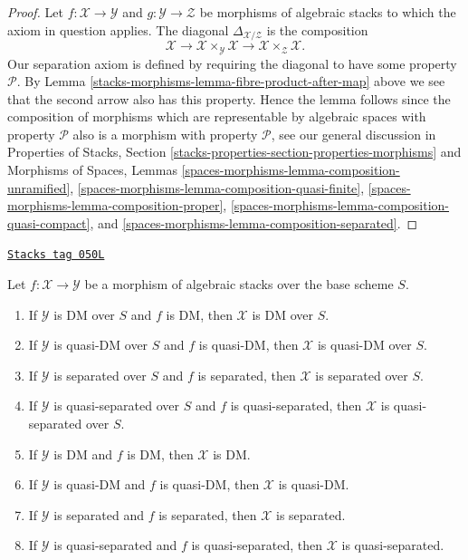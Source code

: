 \begin{proof}
Let $f : \mathcal{X} \to \mathcal{Y}$ and
$g : \mathcal{Y} \to \mathcal{Z}$ be morphisms of algebraic stacks
to which the axiom in question applies.
The diagonal $\Delta_{\mathcal{X}/\mathcal{Z}}$ is the composition
$$
\mathcal{X} \longrightarrow
\mathcal{X} \times_\mathcal{Y} \mathcal{X} \longrightarrow
\mathcal{X} \times_\mathcal{Z} \mathcal{X}.
$$
Our separation axiom is defined by requiring the diagonal
to have some property $\mathcal{P}$. By
Lemma \ref{stacks-morphisms-lemma-fibre-product-after-map}
above we see that the second arrow also has this property.
Hence the lemma follows since the composition of
morphisms which are representable by algebraic spaces with property
$\mathcal{P}$ also is a morphism with property $\mathcal{P}$, see
our general discussion in
Properties of Stacks,
Section \ref{stacks-properties-section-properties-morphisms}
and
Morphisms of Spaces, Lemmas
\ref{spaces-morphisms-lemma-composition-unramified},
\ref{spaces-morphisms-lemma-composition-quasi-finite},
\ref{spaces-morphisms-lemma-composition-proper},
\ref{spaces-morphisms-lemma-composition-quasi-compact}, and
\ref{spaces-morphisms-lemma-composition-separated}.
\end{proof}

\begin{lemma}
\label{stacks-morphisms-lemma-separated-over-separated}
\href{https://stacks.math.columbia.edu/tag/050L}{\texttt{Stacks tag 050L}}

Let $f : \mathcal{X} \to \mathcal{Y}$ be a morphism of algebraic stacks
over the base scheme $S$.
\begin{enumerate}
\item If $\mathcal{Y}$ is DM over $S$ and $f$ is DM,
then $\mathcal{X}$ is DM over $S$.
\item If $\mathcal{Y}$ is quasi-DM over $S$ and $f$ is quasi-DM,
then $\mathcal{X}$ is quasi-DM over $S$.
\item If $\mathcal{Y}$ is separated over $S$ and $f$ is separated,
then $\mathcal{X}$ is separated over $S$.
\item If $\mathcal{Y}$ is quasi-separated over $S$ and $f$ is quasi-separated,
then $\mathcal{X}$ is quasi-separated over $S$.
\item If $\mathcal{Y}$ is DM and $f$ is DM,
then $\mathcal{X}$ is DM.
\item If $\mathcal{Y}$ is quasi-DM and $f$ is quasi-DM,
then $\mathcal{X}$ is quasi-DM.
\item If $\mathcal{Y}$ is separated and $f$ is separated,
then $\mathcal{X}$ is separated.
\item If $\mathcal{Y}$ is quasi-separated and $f$ is quasi-separated,
then $\mathcal{X}$ is quasi-separated.
\end{enumerate}
\end{lemma}

